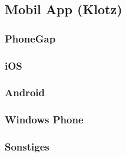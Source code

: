 \subsection{Mobil App (Klotz)}

\subsubsection{PhoneGap}

\subsubsection{iOS}

\subsubsection{Android}

\subsubsection{Windows Phone}

\subsubsection{Sonstiges}
